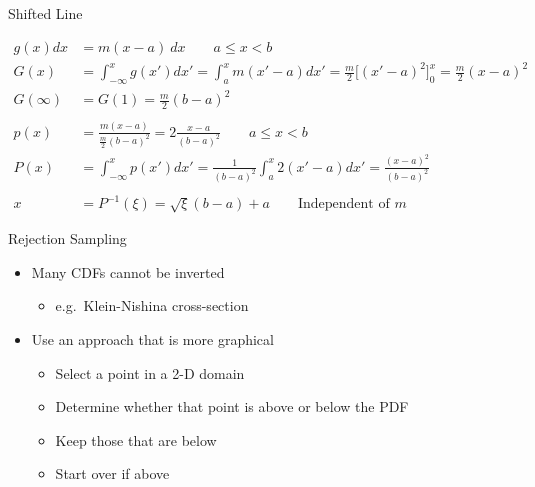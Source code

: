 \documentclass[xcolor=x11names,compress,handout]{beamer}
\renewcommand{\(}{\begin{columns}}
\renewcommand{\)}{\end{columns}}
\newcommand{\<}[1]{\begin{column}{#1}}
\renewcommand{\>}{\end{column}}
\begin{document}
\begin{frame}{Shifted Line}

\[
  \begin{aligned}
  g(x) dx &= m(x - a)\:dx \qquad a \leq x < b\\
  G(x) &= \int_{-\infty}^x g(x')dx' = \int_a^x m(x'-a) dx' = \frac{m}{2}\bigl[(x'-a)^2 \bigr]_0^x = \frac{m}{2} (x-a)^2\\
    G(\infty) &= G(1) = \frac{m}{2}(b-a)^2\\
    \\p(x) &= \frac{m(x-a)}{\frac{m}{2}(b-a)^2} = 2 \frac{x-a}{(b-a)^2}\qquad a \leq x < b\\
    P(x) &= \int_{-\infty}^x p(x')dx' = \frac{1}{(b-a)^2}\int_a^x 2(x'-a) dx' = \frac{(x-a)^2}{(b-a)^2}\\
    &\\
    x &= P^{-1}(\xi) = \sqrt{\xi}(b-a) + a \qquad\text{Independent of }m
  \end{aligned}
\]    
    
\end{frame}


\begin{frame}{Rejection Sampling}

    \begin{itemize}
    \item Many CDFs cannot be inverted
      \begin{itemize}
      \item e.g.\ Klein-Nishina cross-section
      \end{itemize}
    \vspace*{1 em}
    
    \item Use an approach that is more graphical
      \begin{itemize}
      \item Select a point in a 2-D domain
      \item Determine whether that point is above or below the PDF
      \item Keep those that are below
      \item Start over if above
      \end{itemize}
    \end{itemize}

\end{frame}
\end{document}
